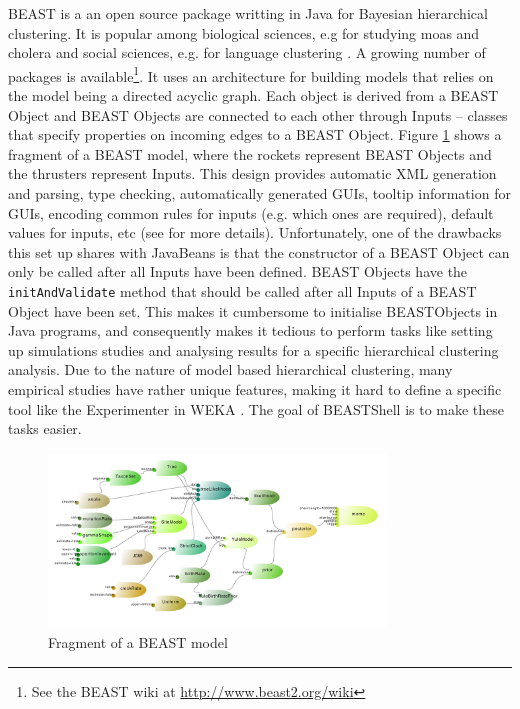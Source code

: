 \documentclass[twoside,11pt]{article}
\begin{document}
BEAST \citep{beast2} is a an open source package writting in Java for Bayesian hierarchical clustering. It is popular among biological sciences, e.g for studying moas \citep{bunce2003extreme} and cholera \citep{mutreja2011evidence} and social sciences, e.g. for language clustering \citep{bouckaert2012mapping,gray2009language}. A growing number of packages is available\footnote{See the BEAST wiki at \url{http://www.beast2.org/wiki}}. It uses an architecture for building models that relies on the model being a directed acyclic graph. Each object is derived from a BEAST Object and BEAST Objects are connected to each other through Inputs -- classes that specify properties on incoming edges to a BEAST Object. Figure \ref{fig.model} shows a fragment of a BEAST model, where the rockets represent BEAST Objects and the thrusters represent Inputs. This design provides automatic XML generation and parsing, type checking, automatically generated GUIs, tooltip information for GUIs, encoding common rules for inputs (e.g. which ones are required), default values for inputs, etc (see \cite{beastbook} for more details). Unfortunately, one of the drawbacks this set up shares with JavaBeans is that the constructor of a BEAST Object can only be called after all Inputs have been defined. BEAST Objects have the {\tt initAndValidate} method that should be called after all Inputs of a BEAST Object have been set. This makes it cumbersome to initialise BEASTObjects in Java programs, and consequently makes it tedious to perform
tasks like setting up simulations studies and analysing results for a specific hierarchical clustering analysis. Due to the nature of model based hierarchical clustering, many empirical studies have rather unique features, making it hard to define a specific tool like  the Experimenter in WEKA \citep{weka}. The goal of BEASTShell is to make these tasks easier.

\begin{figure}
\begin{center}
\includegraphics[width=0.8\textwidth]{model}
\end{center}
\caption{\label{fig.model}Fragment of a BEAST model}
\end{figure}
\end{document}
